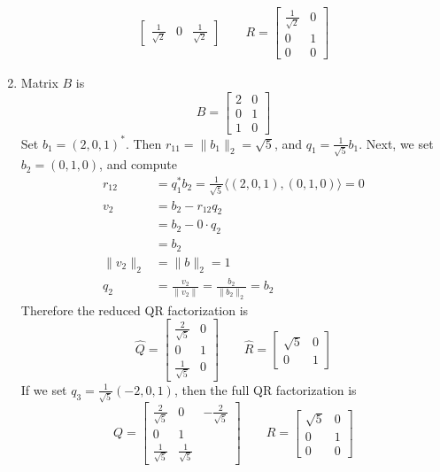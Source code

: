\documentclass[12pt]{article}
\newenvironment{sol}[1][Solution]{\begin{trivlist}
		\item[\hskip \labelsep {\bfseries #1:}]}{\end{trivlist}}
\begin{document}
\begin{sol}
\begin{enumerate}[label=(\alph*)]
\begin{align*}
\begin{bmatrix}
				\frac{1}{\sqrt{2}} & 0 & \frac{1}{\sqrt{2}}
			\end{bmatrix}
			\quad\quad
			R=\begin{bmatrix}
				\frac{1}{\sqrt{2}} & 0\\
				0 & 1\\
				0 & 0
			\end{bmatrix}
		\end{align*}
		\item Matrix $B$ is
		\[
		B=\begin{bmatrix}
			2 & 0\\
			0 & 1\\
			1 & 0
		\end{bmatrix}
		\]
		Set $b_1=(2,0,1)^*$. Then $r_{11}=\lVert b_1\rVert_2=\sqrt{5}$, and $q_1=\frac{1}{\sqrt{5}}b_1$.
		Next, we set $b_2=(0,1,0)$, and compute
		\begin{align*}
			r_{12}&=q_1^*b_2=\frac{1}{\sqrt{5}}\langle (2,0,1), (0,1,0)\rangle=0\\
			v_2&=b_2-r_{12}q_2\\
			&=b_2-0\cdot q_2\\
			&=b_2\\
			\lVert v_2\rVert_2&=\lVert b\rVert_2=1\\
			q_{2}&=\frac{v_2}{\lVert v_2\rVert}=\frac{b_2}{\lVert b_2\rVert_2}=b_2
		\end{align*}
		Therefore the reduced QR factorization is
		\[
		\hat{Q}=\begin{bmatrix}
			\frac{2}{\sqrt{5}} & 0\\
			0 & 1\\
			\frac{1}{\sqrt{5}} & 0
		\end{bmatrix}
		\quad\quad
		\hat{R}=\begin{bmatrix}
			\sqrt{5} & 0\\
			0 & 1
		\end{bmatrix}
		\]
		If we set $q_3=\frac{1}{\sqrt{5}}(-2,0,1)$, then the full QR factorization is
		\[
		Q=\begin{bmatrix}
			\frac{2}{\sqrt{5}} & 0 & -\frac{2}{\sqrt{5}}\\
			0 & 1\\
			\frac{1}{\sqrt{5}} & \frac{1}{\sqrt{5}}
		\end{bmatrix}
		\quad\quad
		R=\begin{bmatrix}
			\sqrt{5} & 0\\
			0 & 1\\
			0 & 0
		\end{bmatrix}
		\]
	\end{enumerate}
\end{sol}
\end{document}
